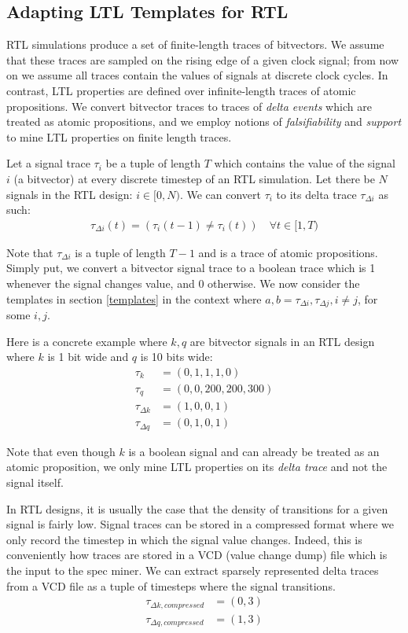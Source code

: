 \documentclass[acmlarge,11pt,nonacm]{acmart}
\begin{document}
\subsection{Adapting LTL Templates for RTL}
RTL simulations produce a set of finite-length traces of bitvectors.
We assume that these traces are sampled on the rising edge of a given clock signal; from now on we assume all traces contain the values of signals at discrete clock cycles.
In contrast, LTL properties are defined over infinite-length traces of atomic propositions.
We convert bitvector traces to traces of \textit{delta events} which are treated as atomic propositions, and we employ notions of \textit{falsifiability} and \textit{support} to mine LTL properties on finite length traces.

Let a signal trace $\tau_i$ be a tuple of length $T$ which contains the value of the signal $i$ (a bitvector) at every discrete timestep of an RTL simulation.
Let there be $N$ signals in the RTL design: $i \in [0,N)$.
We can convert $\tau_i$ to its delta trace $\tau_{\Delta i}$ as such:
\begin{align*}
  \tau_{\Delta i}(t) = (\tau_i(t-1) \neq \tau_i(t)) \quad \forall t \in [1,T)
\end{align*}

Note that $\tau_{\Delta i}$ is a tuple of length $T-1$ and is a trace of atomic propositions.
Simply put, we convert a bitvector signal trace to a boolean trace which is 1 whenever the signal changes value, and 0 otherwise.
We now consider the templates in section \ref{templates} in the context where $a, b = \tau_{\Delta i}, \tau_{\Delta j}, i \neq j$, for some $i, j$.

Here is a concrete example where $k, q$ are bitvector signals in an RTL design where $k$ is 1 bit wide and $q$ is 10 bits wide:
\begin{align*}
  \tau_{k} &= (0, 1, 1, 1, 0) \\
  \tau_{q} &= (0, 0, 200, 200, 300) \\
  \tau_{\Delta k} &= (1, 0, 0, 1) \\
  \tau_{\Delta q} &= (0, 1, 0, 1)
\end{align*}

Note that even though $k$ is a boolean signal and can already be treated as an atomic proposition, we only mine LTL properties on its \textit{delta trace} and not the signal itself.

In RTL designs, it is usually the case that the density of transitions for a given signal is fairly low.
Signal traces can be stored in a compressed format where we only record the timestep in which the signal value changes.
Indeed, this is conveniently how traces are stored in a VCD (value change dump) file which is the input to the spec miner.
We can extract sparsely represented delta traces from a VCD file as a tuple of timesteps where the signal transitions. %
\begin{align*}
  \tau_{\Delta k, compressed} &= (0, 3) \\
  \tau_{\Delta q, compressed} &= (1, 3)
\end{align*}
\end{document}
